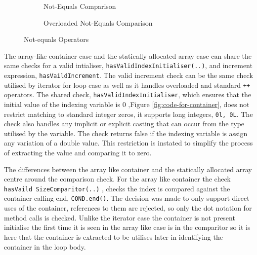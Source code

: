 \documentclass[bsc,frontabs,singlespacing,parskip,deptreport]{infthesis}
\begin{document}
\begin{figure}[h]
    \centering
  
  \begin{subfigure}[h]{\textwidth}
        \centering
        \caption{Not-Equals Comparison}
        \label{fig:for-cmp-neq}
        \vspace{0.40cm}
    \end{subfigure}
    
    \begin{subfigure}[h]{\textwidth}
    \caption{Overloaded Not-Equals Comparison}
    \centering
    \label{for-cmp-neq-overloaded}
    \end{subfigure}

    \caption{Not-equals Operators}
    \label{fig:comp-operators}
\end{figure}
The array-like container case and the statically allocated array case can share the same checks for a valid intialiser, \texttt{hasValidIndexInitialiser(..)}, and increment expression, \texttt{hasVaildIncrement}. The valid increment check can be the same check utilised by iterator for loop case as well as it handles overloaded and standard \texttt{++} operators. The shared check, \texttt{hasValidIndexInitialiser}, which ensures that the initial value of the indexing variable is 0 ,Figure \ref{fig:code-for-container},  does not restrict matching to standard integer zeros, it supports long integers, \texttt{0l, 0L}. The check also handles any implicit or explicit casting that can occur from the type utilised by the variable. The check returns false if the indexing variable is assign any variation of a double value. This restriction is instated to  simplify the process of extracting the value and comparing it to zero.

The differences between the array like container and the statically allocated array centre around the comparison check. For the array like container the check \texttt{hasVaild SizeComparitor(..)} , checks the index is compared against the container calling end, \texttt{COND.end()}. The decision was made to only support direct uses of the container, references  to them are rejected, so only the dot notation for method calls is checked. Unlike the iterator case the container is not present initialise the first time it is seen in the array like case is in the comparitor so it is here that the container is extracted to be utilises later in identifying the container in the loop body.
\end{document}
